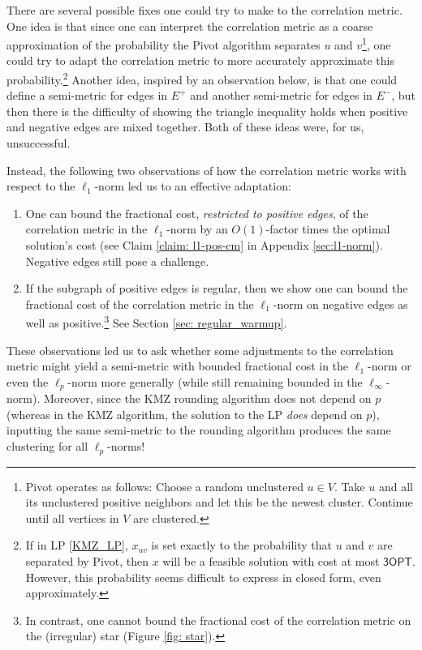 There are several possible fixes one could try to make to the correlation metric. 
One idea is that since one can interpret the correlation metric as a coarse approximation of the probability the Pivot algorithm separates $u$ and $v$\footnote{Pivot operates as follows: Choose a random unclustered $u \in V$. Take $u$ and all its unclustered positive neighbors and let this be the newest cluster. Continue until all vertices in $V$ are clustered.}, 
one could try to adapt the correlation metric to more accurately approximate this probability.\footnote{If in LP \ref{KMZ_LP}, $x_{uv}$ is set exactly to the probability that $u$ and $v$ are separated by Pivot, then $x$ will be a feasible solution with cost at most $\textsf{3OPT}$. However, this probability seems difficult to express in closed form, even approximately.}
Another idea, inspired by an observation below, is that one could define a semi-metric for edges in $E^+$ and another semi-metric for edges in $E^-$, but then there is the difficulty of showing the triangle inequality holds when positive and negative edges are mixed together. 
Both of these ideas were, for us, unsuccessful.


Instead, the following two observations of how the correlation metric works with respect to the $\ell_1$-norm led us to an effective adaptation: 
\begin{enumerate}
\item One can bound the fractional cost, \textit{restricted to positive edges}, of the correlation metric in the $\ell_1$-norm  by an $O(1)$-factor times the optimal solution's cost (see Claim \ref{claim: l1-pos-cm} in Appendix \ref{sec:l1-norm}). Negative edges still pose a challenge.
\item If the subgraph of positive edges is regular, then we show one can bound the fractional cost of the correlation metric in the $\ell_1$-norm on negative edges as well as positive.\footnote{In contrast, one cannot bound the fractional cost of the correlation metric on the (irregular) star (Figure \ref{fig: star}).} See Section \ref{sec: regular_warmup}. 
\end{enumerate}


These observations led us to ask whether some adjustments to the correlation metric might yield a semi-metric with bounded fractional cost in the $\ell_1$-norm or even the $\ell_p$-norm more generally (while still remaining bounded in the $\ell_{\infty}$-norm). Moreover, since the KMZ rounding algorithm does not depend on $p$ (whereas in the KMZ algorithm, the solution to the LP \textit{does} depend on $p$), inputting the same semi-metric to the rounding algorithm produces the same clustering for all $\ell_p$-norms! 

